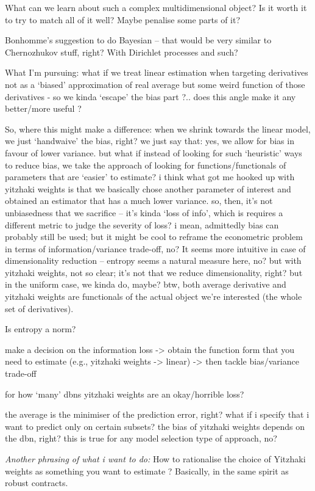 \documentclass[a4paper,12pt,twoside]{article}
\begin{document}
What can we learn about such a complex multidimensional object? Is it worth it to try to match all of it well? Maybe penalise some parts of it?

Bonhomme's suggestion to do Bayesian -- that would be very similar to Chernozhukov stuff, right? With Dirichlet processes and such?


What I'm pursuing: what if we treat linear estimation when targeting derivatives not as a `biased' approximation of real average but some weird function of those derivatives - so we kinda `escape' the bias part ?.. does this angle make it any better/more useful ?

So, where this might make a difference: when we shrink towards the linear model, we just `handwaive' the bias, right? we just say that: yes, we allow for bias in favour of lower variance. but what if instead of looking for such `heuristic' ways to reduce bias, we take the approach of looking for functions/functionals of parameters that are `easier' to estimate? i think what got me hooked up with yitzhaki weights is that we basically chose another parameter of interest and obtained an estimator that has a much lower variance. so, then, it's not unbiasedness that we sacrifice -- it's kinda `loss of info', which is requires a different metric to judge the severity of loss? i mean, admittedly bias can probably still be used; but it might be cool to reframe the econometric problem in terms of information/variance trade-off, no? It seems more intuitive in case of dimensionality reduction -- entropy seems a natural measure here, no? but with yitzhaki weights, not so clear; it's not that we reduce dimensionality, right? but in the uniform case, we kinda do, maybe? btw, both average derivative and yitzhaki weights are functionals of the actual object we're interested (the whole set of derivatives).

Is entropy a norm?

make a decision on the information loss -> obtain the function form that you need to estimate (e.g., yitzhaki weights -> linear) -> then tackle bias/variance trade-off

for how `many' dbns yitzhaki weights are an okay/horrible loss?

the average is the minimiser of the prediction error, right?
what if i specify that i want to predict only on certain subsets?
the bias of yitzhaki weights depends on the dbn, right?
this is true for any model selection type of approach, no?


\textit{Another phrasing of what i want to do:} How to rationalise the choice of Yitzhaki weights as something you want to estimate ? Basically, in the same spirit as robust contracts.
\end{document}
